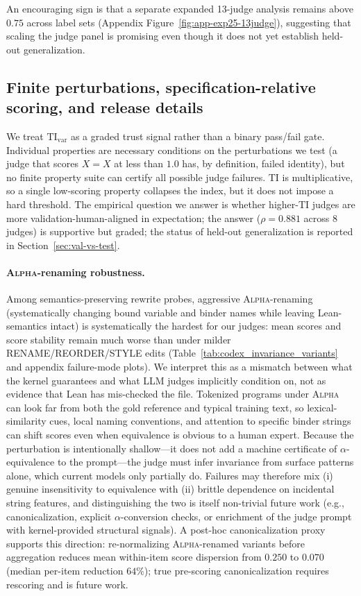 \documentclass{article}
\begin{document}
An encouraging sign is that a separate expanded 13-judge analysis remains above \(0.75\) across label sets (Appendix Figure~\ref{fig:app-exp25-13judge}), suggesting that scaling the judge panel is promising even though it does not yet establish held-out generalization.

\subsection{Finite perturbations, specification-relative scoring, and release details}\label{sec:limitations-finite}
We treat \(\mathrm{TI}_{\mathrm{var}}\) as a graded trust signal rather than a binary pass/fail gate.
Individual properties are necessary conditions on the perturbations we test (a judge that scores \(X=X\) at less than \(1.0\) has, by definition, failed identity), but no finite property suite can certify all possible judge failures.
TI is multiplicative, so a single low-scoring property collapses the index, but it does not impose a hard threshold.
The empirical question we answer is whether higher-TI judges are more validation-human-aligned in expectation; the answer (\(\rho=0.881\) across \(8\) judges) is supportive but graded; the status of held-out generalization is reported in Section~\ref{sec:val-vs-test}.

\paragraph{\textsc{Alpha}-renaming robustness.}
Among semantics-preserving rewrite probes, aggressive \textsc{Alpha}-renaming (systematically changing bound variable and binder names while leaving Lean-semantics intact) is systematically the hardest for our judges: mean scores and score stability remain much worse than under milder RENAME/REORDER/STYLE edits (Table~\ref{tab:codex_invariance_variants} and appendix failure-mode plots).
We interpret this as a mismatch between what the kernel guarantees and what LLM judges implicitly condition on, not as evidence that Lean has mis-checked the file.
Tokenized programs under \textsc{Alpha} can look far from both the gold reference and typical training text, so lexical-similarity cues, local naming conventions, and attention to specific binder strings can shift scores even when equivalence is obvious to a human expert.
Because the perturbation is intentionally shallow---it does not add a machine certificate of \(\alpha\)-equivalence to the prompt---the judge must infer invariance from surface patterns alone, which current models only partially do.
Failures may therefore mix (i) genuine insensitivity to equivalence with (ii) brittle dependence on incidental string features, and distinguishing the two is itself non-trivial future work (e.g., canonicalization, explicit $\alpha$-conversion checks, or enrichment of the judge prompt with kernel-provided structural signals).
A post-hoc canonicalization proxy supports this direction: re-normalizing \textsc{Alpha}-renamed variants before aggregation reduces mean within-item score dispersion from \(0.250\) to \(0.070\) (median per-item reduction \(64\%\)); true pre-scoring canonicalization requires rescoring and is future work.
\end{document}

